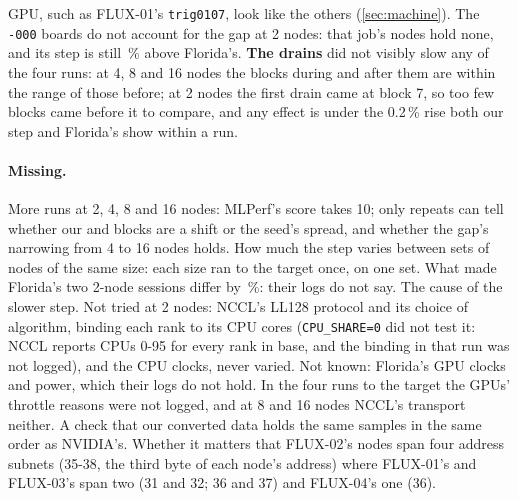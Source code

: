 GPU, such as FLUX-01's \texttt{trig0107}, look like the others (\cref{sec:machine}). The \texttt{-000} boards do not account for the gap at 2 nodes: that job's nodes hold none, and its step is still \TriFxGapPct\,\% above Florida's. \textbf{The drains} did not visibly slow any of the four runs: at 4, 8 and 16 nodes the blocks during and after them are within the range of those before; at 2 nodes the first drain came at block 7, so too few blocks came before it to compare, and any effect is under the 0.2\,\% rise both our step and Florida's show within a run.

\paragraph{Missing.} More runs at 2, 4, 8 and 16 nodes: MLPerf's score takes 10; only repeats can tell whether our \TriFxBlocks{} and \TriFxSixteenBlocks{} blocks are a shift or the seed's spread, and whether the gap's narrowing from 4 to 16 nodes holds. How much the step varies between sets of nodes of the same size: each size ran to the target once, on one set. What made Florida's two 2-node sessions differ by \TriFxScaleFlSessionPct\,\%: their logs do not say. The cause of the slower step. Not tried at 2 nodes: NCCL's LL128 protocol and its choice of algorithm, binding each rank to its CPU cores (\texttt{CPU\_SHARE=0} did not test it: NCCL reports CPUs 0-95 for every rank in base, and the binding in that run was not logged), and the CPU clocks, never varied. Not known: Florida's GPU clocks and power, which their logs do not hold. In the four runs to the target the GPUs' throttle reasons were not logged, and at 8 and 16 nodes NCCL's transport neither. A check that our converted data holds the same samples in the same order as NVIDIA's. Whether it matters that FLUX-02's nodes span four address subnets (35-38, the third byte of each node's address) where FLUX-01's and FLUX-03's span two (31 and 32; 36 and 37) and FLUX-04's one (36).
